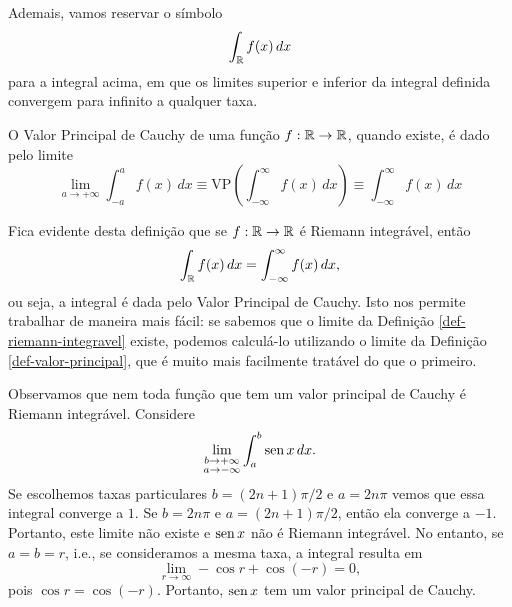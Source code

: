         Ademais, vamos reservar o símbolo
        \begin{equation*}
            \int_{\mathbb{R}} f(x) \, dx
        \end{equation*}
        para a integral acima, em que os limites superior e inferior da integral definida
        convergem para infinito a qualquer taxa.
        \begin{definicao}
        \label{def-valor-principal}
            O Valor Principal de Cauchy de uma função $f:\mathbb{R}\to\mathbb{R}$, quando existe, é dado pelo limite
            \begin{equation*}
                \lim_{a\to +\infty} \int_{-a}^a f(x) \, dx 
                \equiv \text{VP}\left( \int_{-\infty}^{\infty} f(x) \, dx \right)
                \equiv \int_{-\infty}^{\infty} f(x) \, dx
            \end{equation*}
        \end{definicao}
        Fica evidente desta definição que se $f:\mathbb{R}\to\mathbb{R}$ é Riemann integrável, então
        \begin{equation*}
            \int_{\mathbb{R}} f(x) \, dx = \int_{-\infty}^{\infty} f(x) \, dx,
        \end{equation*}
        ou seja, a integral é dada pelo Valor Principal de Cauchy. Isto nos permite trabalhar de
        maneira mais fácil: se sabemos que o limite da Definição \ref{def-riemann-integravel} 
        existe, podemos calculá-lo utilizando o limite da Definição \ref{def-valor-principal}, 
        que é muito mais facilmente tratável do que o primeiro.
        
        Observamos que nem toda função que tem um valor principal de Cauchy é Riemann integrável. Considere
        \begin{equation*}
            \lim_{\substack{b\to +\infty \\ a\to -\infty}} \int_a^b \operatorname{sen}{x} \, dx. 
        \end{equation*}
        Se escolhemos taxas particulares $b = (2n+1)\pi/2$ e $a = 2n\pi$ vemos que essa integral converge a $1$. 
        Se $b = 2n\pi$ e $a = (2n+1)\pi/2$, então ela converge a $-1$. Portanto, este limite não existe e 
        $\operatorname{sen}{x}$ não é Riemann integrável. No entanto, se $a = b = r$, i.e., se consideramos a mesma taxa, 
        a integral resulta em
        \begin{equation*}
            \lim_{r \to \infty} - \cos r + \cos(-r) = 0,
        \end{equation*}
        pois $\cos r = \cos(-r)$. Portanto, $\operatorname{sen}{x}$ tem um valor principal de Cauchy.

